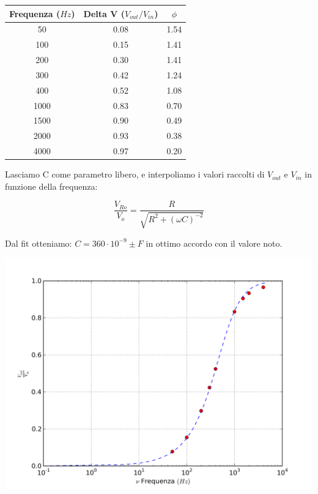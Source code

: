 \begin{center}

\begin{tabular}{*{3}{c}}
Frequenza ($Hz$) & Delta V ($V_{out}/V_{in}$) & $\phi$ \\
\midrule
50 & 0.08 & 1.54\\
100 & 0.15 & 1.41\\
200 & 0.30 & 1.41\\
300 & 0.42 & 1.24\\
400 & 0.52 & 1.08 \\
1000 & 0.83 & 0.70\\
1500 & 0.90 & 0.49\\
2000 & 0.93 & 0.38\\
4000 & 0.97 & 0.20 \\
\end{tabular}
\end{center}

Lasciamo C come parametro libero, e interpoliamo i valori raccolti di $V_{out}$ e $V_{in}$ in funzione della frequenza:

$$\frac{V_{Ro}}{V_o} = \frac{R}{\sqrt{R^2+(\omega C)^{-2}}}$$

Dal fit otteniamo: $C=360 \cdot 10^{-9} \pm  F $ in ottimo accordo con il valore noto.

\begin{center}
 \includegraphics[scale=0.70]{grafici/C3/ddpcond.png}
\end{center}

